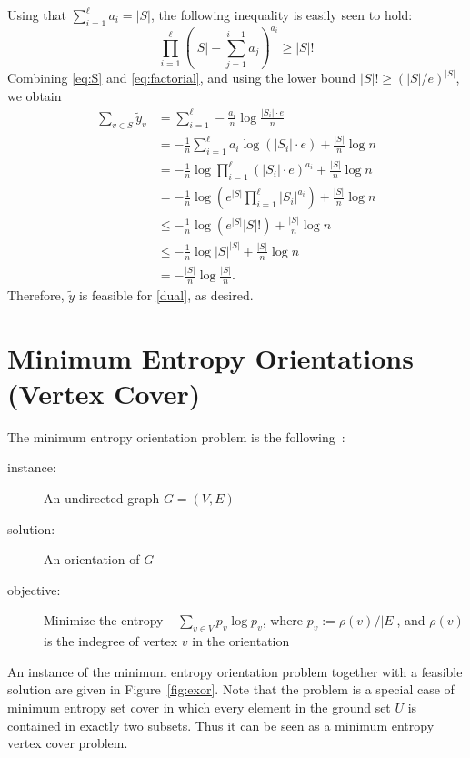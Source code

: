 \documentclass[10pt,a4paper]{article}
\begin{document}
Using that $\sum_{i=1}^{\ell}a_{i} = |S|$, the following inequality is easily seen to hold:
\begin{equation}
\label{eq:factorial}
\prod_{i=1}^{\ell}\left(|S| - \sum_{j=1}^{i-1}a_{j}\right)^{a_{i}} \geq |S|!
\end{equation}
Combining \eqref{eq:S} and \eqref{eq:factorial}, and using the lower bound $|S|! \geq (|S| / e)^{|S|}$, 
we obtain
\begin{align*}
\sum_{v \in S} \tilde y_{v} &= \sum_{i=1}^{\ell} -\frac{a_{i}}{n}\log \frac{|S_{i}|\cdot e}{n} \\
&= -\frac{1}{n} \sum_{i=1}^{\ell} a_{i}\log\left( |S_{i}|\cdot e\right) + \frac{|S|}{n}\log n \\
&= -\frac{1}{n} \log \prod_{i=1}^{\ell} \left( |S_{i}|\cdot e\right)^{a_{i}} + \frac{|S|}{n}\log n \\
&= -\frac{1}{n} \log \left(e^{|S|} \prod_{i=1}^{\ell} |S_{i}|^{a_{i}} \right) + \frac{|S|}{n}\log n \\
&\leq -\frac{1}{n} \log \left(e^{|S|} |S|! \right) + \frac{|S|}{n}\log n \\
&\leq -\frac{1}{n} \log |S|^{|S|}+ \frac{|S|}{n}\log n \\
&= -\frac{|S|}{n}\log \frac{|S|}{n}.
\end{align*}
Therefore, $\tilde y$ is feasible for \eqref{dual}, as desired.

\section{Minimum Entropy Orientations (Vertex Cover)}

The minimum entropy orientation problem is the following~\cite{CFJ08b}:
\begin{description}
\item[\sc instance:] An undirected graph $G=(V,E)$ 
\item[\sc solution:] An orientation of $G$ 
\item[\sc objective:] Minimize the entropy $- \sum_{v\in V} p_v \log p_v$, where $p_v := \rho(v) / |E|$, and $\rho(v)$ is the indegree of
vertex $v$ in the orientation 
\end{description}

An instance of the minimum entropy orientation problem together with a feasible solution are given in Figure~\ref{fig:exor}. Note that the problem is a special case of minimum entropy set cover in which every element in the ground set $U$ is contained in exactly two subsets. Thus it can be seen as a minimum entropy vertex cover problem. 
\end{document}
